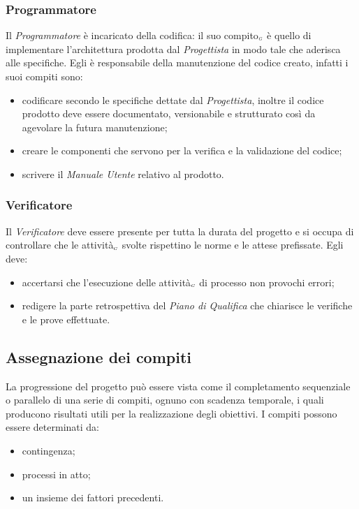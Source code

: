 \subsubsection{Programmatore}\label{ProcessiOrganizzativiProcessoDiPianificazioneRuoliDiProgettoProgrammatore}

Il \textit{Programmatore} è incaricato della codifica: il suo compito$_{\scaleto{G}{3pt}}$ è quello di implementare l'architettura prodotta dal \textit{Progettista} in modo tale che aderisca alle specifiche. Egli è responsabile della manutenzione del codice creato, infatti i suoi compiti sono:
\begin{itemize}
	\item codificare secondo le specifiche dettate dal \textit{Progettista}, inoltre il codice prodotto deve essere documentato, versionabile e strutturato così da agevolare la futura manutenzione;
	\item creare le componenti che servono per la verifica e la validazione del codice;
	\item scrivere il \textit{Manuale Utente} relativo al prodotto.
\end{itemize}

\subsubsection{Verificatore}\label{ProcessiOrganizzativiProcessoDiPianificazioneRuoliDiProgettoVerificatore}

Il \textit{Verificatore} deve essere presente per tutta la durata del progetto e si occupa di controllare che le attività$_{\scaleto{G}{3pt}}$ svolte rispettino le norme e le attese prefissate. Egli deve:
\begin{itemize}
	\item accertarsi che l'esecuzione delle attività$_{\scaleto{G}{3pt}}$ di processo non provochi errori;
	\item redigere la parte retrospettiva del \textit{Piano di Qualifica} che chiarisce le verifiche e le prove effettuate.
\end{itemize}

\subsection{Assegnazione dei compiti}\label{ProcessiOrganizzativiProcessoDiPianificazioneAssegnazioneDeiCompiti}

La progressione del progetto può essere vista come il completamento sequenziale o parallelo di una serie di compiti, ognuno con scadenza temporale, i quali producono risultati utili per la realizzazione degli obiettivi. I compiti possono essere determinati da:
\begin{itemize}
	\item contingenza;
	\item processi in atto;
	\item un insieme dei fattori precedenti.
\end{itemize}

